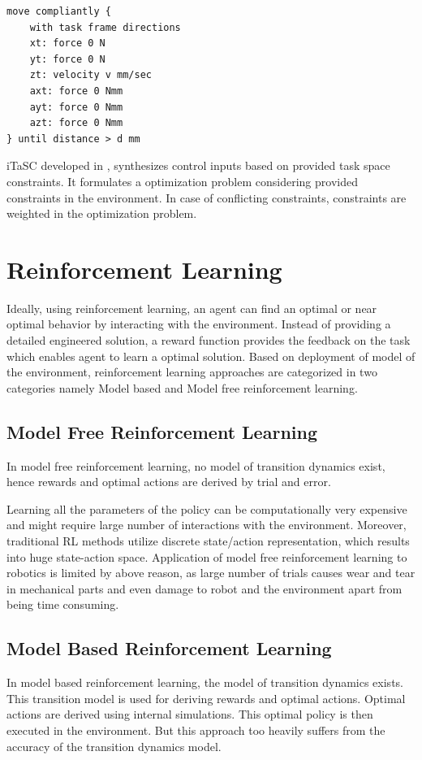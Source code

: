 \documentclass[thesis]{mas_proposal}
\begin{document}
\begin{lstlisting}[label=tff,caption=Task Specification using TFF: Open Door]
move compliantly {
	with task frame directions
	xt: force 0 N
	yt: force 0 N
	zt: velocity v mm/sec
	axt: force 0 Nmm
	ayt: force 0 Nmm
	azt: force 0 Nmm
} until distance > d mm 
\end{lstlisting}


iTaSC developed in \cite{DeSchutter-ijrr2007, DecreBruyninckxDeSchutter2013, decre09}, synthesizes control inputs based on provided task space constraints. It formulates a optimization problem considering provided constraints in the environment. In case of conflicting constraints, constraints are weighted in the optimization problem. 

\chapter{Reinforcement Learning}

Ideally, using reinforcement learning, an agent can find an optimal or near optimal behavior by interacting with the environment. Instead of providing a detailed engineered solution, a reward function provides the feedback on the task which enables agent to learn a optimal solution. Based on deployment of model of the environment, reinforcement learning approaches are categorized in two categories namely Model based and Model free reinforcement learning. 

\section{Model Free Reinforcement Learning}

In model free reinforcement learning, no model of transition dynamics exist, hence rewards and optimal actions are derived by trial and error\cite{polydoros2017survey}. 



Learning all the parameters of the policy can be computationally very expensive and might require large number of interactions with the environment. Moreover, traditional RL methods utilize discrete state/action representation, which results into huge state-action space\cite{nemec2017door}. Application of model free reinforcement learning to robotics is limited by above reason, as large number of trials causes wear and tear in mechanical parts and even damage to robot and the environment apart from being time consuming.

\section{Model Based Reinforcement Learning} \label{mod-RL}
In model based  reinforcement learning, the model of transition dynamics exists. This transition model is used for deriving rewards and optimal actions. Optimal actions are derived using internal simulations. This optimal policy is then executed in the environment. But this approach too heavily suffers from the accuracy of the transition dynamics model.
\end{document}
